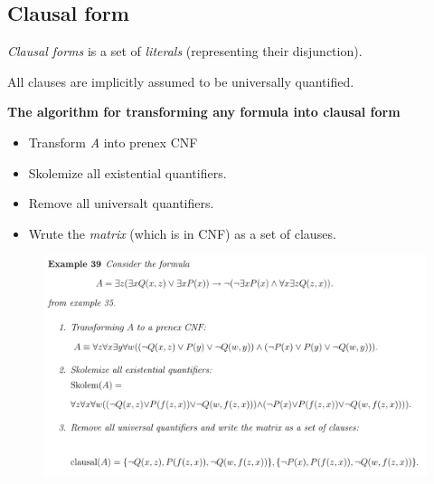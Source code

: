 \subsection{Clausal form}

\textit{Clausal forms} \cite[p. 62]{LecPartII} is a set of \textit{literals} (representing their disjunction).

All clauses are implicitly assumed to be universally quantified.

\textbf{The algorithm for transforming any formula into clausal form}

\begin{itemize}
\item Transform \textit{A} into prenex CNF
\item Skolemize all existential quantifiers.
\item Remove all universalt quantifiers.
\item Wrute the \textit{matrix} (which is in CNF) as a set of clauses.
\end{itemize}

\begin{figure}[H]
\includegraphics[scale=0.6]{./figures/clausalex.pdf}
\end{figure}

 